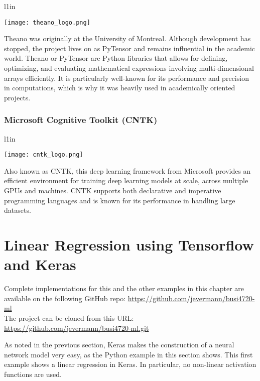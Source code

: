 \begin{wrapfigure}{l}{1in}
\begin{center}
\texttt{[image: theano\_logo.png]}
\end{center}
\end{wrapfigure}

Theano was originally at the University of Montreal. Although development has stopped, the project lives on as PyTensor and remains influential in the academic world. Theano or PyTensor are Python libraries that allows for defining, optimizing, and evaluating mathematical expressions involving multi-dimensional arrays efficiently. It is particularly well-known for its performance and precision in computations, which is why it was heavily used in academically oriented projects.

\subsubsection*{Microsoft Cognitive Toolkit (CNTK)}

\begin{wrapfigure}{l}{1in}
\begin{center}
\texttt{[image: cntk\_logo.png]}
\end{center}
\end{wrapfigure}

Also known as CNTK, this deep learning framework from Microsoft provides an efficient environment for training deep learning models at scale, across multiple GPUs and machines. CNTK supports both declarative and imperative programming languages and is known for its performance in handling large datasets.

\section{Linear Regression using Tensorflow and Keras}

\begin{resourcebox}
\footnotesize
Complete implementations for this and the other examples in this chapter are available on the following GitHub repo:
\url{https://github.com/jevermann/busi4720-ml} \\

The project can be cloned from this URL:
\url{https://github.com/jevermann/busi4720-ml.git}
\normalsize
\end{resourcebox}

As noted in the previous section, Keras makes the construction of a neural network model very easy, as the Python example in this section shows. This first example shows a linear regression in Keras. In particular, no non-linear activation functions are used. 

